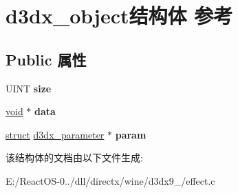 \hypertarget{structd3dx__object}{}\section{d3dx\+\_\+object结构体 参考}
\label{structd3dx__object}
\subsection*{Public 属性}
\begin{DoxyCompactItemize}
\item 
\mbox{\label{structd3dx__object_a0e24124b28fe61d666d5e1724964dcad}} 
U\+I\+NT {\bfseries size}
\item 
\mbox{\label{structd3dx__object_ac0fccc17c7b0fd8c04e6bad58151497b}} 
\hyperlink{interfacevoid}{void} $\ast$ {\bfseries data}
\item 
\mbox{\label{structd3dx__object_a86cbb59e47130ad4c6d16c1da01eb036}} 
\hyperlink{interfacestruct}{struct} \hyperlink{structd3dx__parameter}{d3dx\+\_\+parameter} $\ast$ {\bfseries param}
\end{DoxyCompactItemize}


该结构体的文档由以下文件生成\+:\begin{DoxyCompactItemize}
\item 
E\+:/\+React\+O\+S-\/0../dll/directx/wine/d3dx9\+\_/effect.\+c\end{DoxyCompactItemize}
